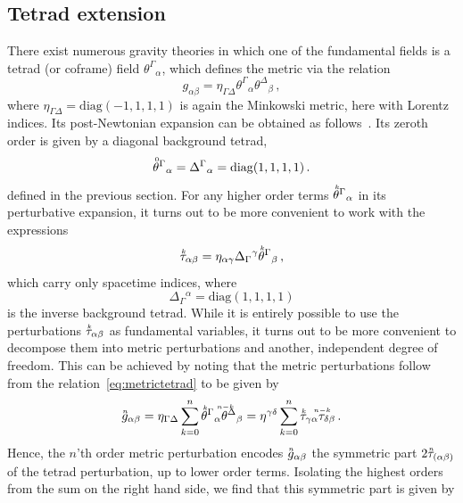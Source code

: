 \documentclass[notitlepage,a4paper,aps,prd,onecolumn,superscriptaddress,nofootinbib,groupedaddress,longbibliography]{revtex4-1}
\newcommand{\order}[2]{\accentset{#2}{#1}}
\begin{document}
\subsection{Tetrad extension}\label{ssec:ppntet}
There exist numerous gravity theories in which one of the fundamental fields is a tetrad (or coframe) field \(\theta^{\Gamma}{}_{\alpha}\), which defines the metric via the relation
\begin{equation}\label{eq:metrictetrad}
g_{\alpha\beta} = \eta_{\Gamma\Delta}\theta^{\Gamma}{}_{\alpha}\theta^{\Delta}{}_{\beta}\,,
\end{equation}
where \(\eta_{\Gamma\Delta} = \mathrm{diag}(-1, 1, 1, 1)\) is again the Minkowski metric, here with Lorentz indices. Its post-Newtonian expansion can be obtained as follows~\cite{Nitsch:1979qn,Smalley:1980em,Hayward:1981bk}. Its zeroth order is given by a diagonal background tetrad,
\begin{equation}
\order{\theta}{0}^{\Gamma}{}_{\alpha} = \Delta^{\Gamma}{}_{\alpha} = \mathrm{diag}(1, 1, 1, 1)\,.
\end{equation}
defined in the previous section. For any higher order terms \(\order{\theta}{k}^{\Gamma}{}_{\alpha}\) in its perturbative expansion, it turns out to be more convenient to work with the expressions~\cite{Ualikhanova:2019ygl,Hohmann:2020vcv}
\begin{equation}
\order{\tau}{k}_{\alpha\beta} = \eta_{\alpha\gamma}\Delta_{\Gamma}{}^{\gamma}\order{\theta}{k}^{\Gamma}{}_{\beta}\,,
\end{equation}
which carry only spacetime indices, where
\begin{equation}
\Delta_{\Gamma}{}^{\alpha} = \mathrm{diag}(1, 1, 1, 1)
\end{equation}
is the inverse background tetrad. While it is entirely possible to use the perturbations \(\order{\tau}{k}_{\alpha\beta}\) as fundamental variables, it turns out to be more convenient to decompose them into metric perturbations and another, independent degree of freedom. This can be achieved by noting that the metric perturbations follow from the relation~\eqref{eq:metrictetrad} to be given by
\begin{equation}
\order{g}{n}_{\alpha\beta} = \eta_{\Gamma\Delta}\sum_{k = 0}^{n}\order{\theta}{k}^{\Gamma}{}_{\alpha}\order{\theta}{n-k}^{\Delta}{}_{\beta} = \eta^{\gamma\delta}\sum_{k = 0}^{n}\order{\tau}{k}_{\gamma\alpha}\order{\tau}{n-k}_{\delta\beta}\,.
\end{equation}
Hence, the $n$'th order metric perturbation encodes \(\order{g}{n}_{\alpha\beta}\) the symmetric part \(2\order{\tau}{n}_{(\alpha\beta)}\) of the tetrad perturbation, up to lower order terms. Isolating the highest orders from the sum on the right hand side, we find that this symmetric part is given by
\end{document}
